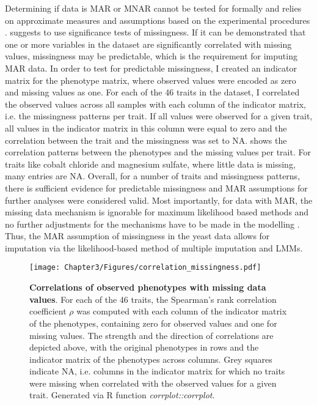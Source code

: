 Determining if data is MAR or MNAR cannot be tested for formally and relies on approximate measures and assumptions based on the experimental procedures \citep{Schafer2002,Garson2015,Templ2012}. \citet{Garson2015} suggests to use significance tests of missingness. If it can be demonstrated that one or more variables in the dataset are significantly correlated with missing values, missingness may be predictable, which is the requirement for imputing MAR data. In order to test for predictable missingness, I created an indicator matrix for the phenotype matrix, where observed values were encoded as zero and missing values as one. For each of the \num{46} traits in the dataset, I correlated the observed values across all samples with each column of the indicator matrix, i.e. the missingness patterns per trait. If all values were observed for a given trait, all values in the indicator matrix in this column were equal to zero and the correlation between the trait and the missingness was set to NA.  shows the correlation patterns between the phenotypes and the missing values per trait. For traits like cobalt chloride and magnesium sulfate, where little data is missing, many entries are NA. Overall, for a number of traits and missingness patterns, there is sufficient evidence for predictable missingness and MAR assumptions for further analyses were considered valid. Most importantly, for data with MAR, the missing data mechanism is ignorable for maximum likelihood based methods and no further adjustments for the mechanisms have to be made in the modelling \citep{Rubin1976,Little1988}. Thus, the MAR assumption of missingness in the yeast data allows for imputation via the likelihood-based method of multiple imputation and LMMs.


\begin{figure}[hbtp]
	\centering
	\texttt{[image: Chapter3/Figures/correlation\_missingness.pdf]}
	\caption[\textbf{Correlations of observed phenotypes with missing data values.}]{\textbf{Correlations of observed phenotypes with missing data values}. For each of the \num{46} traits, the Spearman's rank correlation coefficient \(\rho\) was computed with each column of the indicator matrix of the phenotypes, containing zero for observed values and one for missing values. The strength and the direction of correlations are depicted above, with the original phenotypes in rows and the indicator matrix of the phenotypes across columns.  Grey squares indicate NA, i.e. columns in the indicator matrix for which no traits were missing when correlated with the observed values for a given trait. Generated via R function \textit{corrplot::corrplot}.}
 	\label{fig:missingnesscorrelations}
\end{figure}

